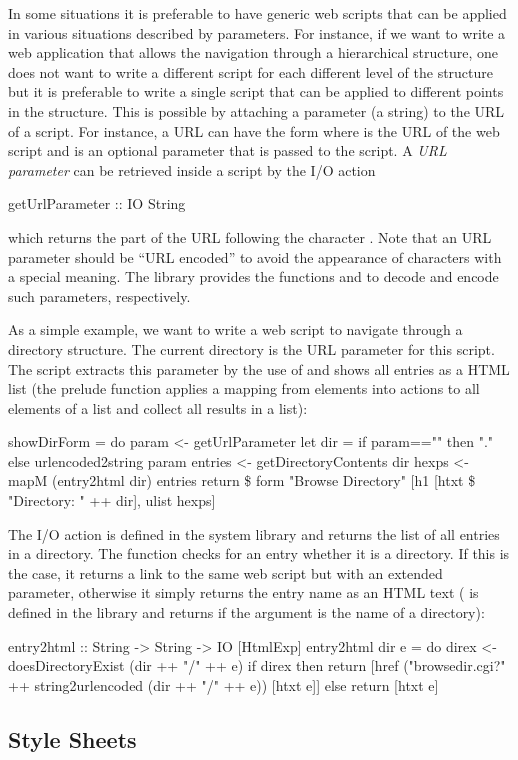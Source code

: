 In some situations it is preferable to have generic web scripts that
can be applied in various situations described by parameters.
For instance, if we want to write a web application that
allows the navigation through a hierarchical structure,
one does not want to write a different script for each different
level of the structure but it is preferable to write a single
script that can be applied to different points in the structure.
This is possible by attaching a parameter (a string)
to the URL of a script. For instance, a URL can have the form
 where
 is the URL of the web script
and  is an optional parameter that is passed
to the script.
A \emph{URL parameter}
can be retrieved inside a script
by the I/O action
%
\begin{prog}
getUrlParameter :: IO String 
\end{prog}
%
which returns the part of the URL following the character .
Note that an URL parameter should be ``URL encoded'' to avoid
the appearance of characters with a special meaning.
The library  provides the functions
 and 
to decode and encode such parameters, respectively.

As a simple example, we want to write a web script to navigate
through a directory structure. The current directory
is the URL parameter for this script. The script
extracts this parameter by the use of 
and shows all entries as a HTML list
(the prelude function  applies
a mapping from elements into actions to all elements of a list
and collect all results in a list):
%
\begin{prog}
showDirForm = do
  param <- getUrlParameter
  let dir = if param=="" then "." else urlencoded2string param
  entries <- getDirectoryContents dir
  hexps <- mapM (entry2html dir) entries
  return \$ form "Browse Directory"
                [h1 [htxt \$ "Directory: " ++ dir], ulist hexps]
\end{prog}
%
The I/O action 
is defined in the system library 
and returns the list of all entries in a directory.
The function  checks for an entry whether it
is a directory. If this is the case, it returns a link to
the same web script but with an extended parameter, otherwise
it simply returns the entry name as an HTML text
(
is defined in the library  and returns 
if the argument is the name of a directory):
%
\begin{prog}
entry2html :: String -> String -> IO [HtmlExp]
entry2html dir e = do
  direx <- doesDirectoryExist (dir ++ "/" ++ e)
  if direx
   then return [href ("browsedir.cgi?" ++ string2urlencoded (dir ++ "/" ++ e))
                     [htxt e]]
   else return [htxt e]
\end{prog}
%


\subsection{Style Sheets}



